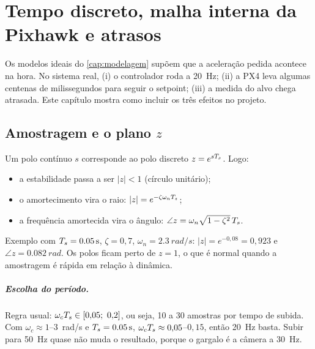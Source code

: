 \chapter{Tempo discreto, malha interna da Pixhawk e atrasos}
\label{cap:discreto}

Os modelos ideais do \cref{cap:modelagem} supõem que a aceleração pedida acontece na
hora. No sistema real, (i) o controlador roda a \SI{20}{Hz}; (ii) a PX4 leva algumas
centenas de milissegundos para seguir o setpoint; (iii) a medida do alvo chega
atrasada. Este capítulo mostra como incluir os três efeitos no projeto.

\section{Amostragem e o plano $z$}
Um polo contínuo $s$ corresponde ao polo discreto $z=e^{sT_s}$. Logo:
\begin{itemize}
  \item a estabilidade passa a ser $|z|<1$ (círculo unitário);
  \item o amortecimento vira o raio: $|z| = e^{-\zeta\omega_n T_s}$;
  \item a frequência amortecida vira o ângulo: $\angle z = \omega_n\sqrt{1-\zeta^2}\,T_s$.
\end{itemize}
Exemplo com $T_s=\SI{0,05}{s}$, $\zeta=0{,}7$, $\omega_n=\SI{2,3}{rad/s}$:
$|z| = e^{-0{,}08}=0{,}923$ e $\angle z = \SI{0,082}{rad}$. Os polos ficam perto de
$z=1$, o que é normal quando a amostragem é rápida em relação à dinâmica.

\paragraph{Escolha do período.} Regra usual: $\omega_c\Ts\in[0{,}05;\ 0{,}2]$, ou seja,
10 a 30 amostras por tempo de subida. Com $\omega_c\approx 1$--\SI{3}{rad/s} e
$T_s=\SI{0,05}{s}$, $\omega_cT_s\approx0{,}05$--$0{,}15$, então \SI{20}{Hz} basta. Subir
para \SI{50}{Hz} quase não muda o resultado, porque o gargalo é a câmera a \SI{30}{Hz}.

